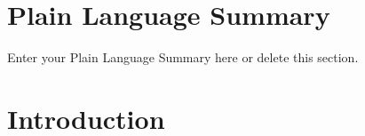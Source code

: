 \documentclass[draft]{agujournal2019}
\begin{document}
\section*{Plain Language Summary}
Enter your Plain Language Summary here or delete this section.



%
%

%


%
%
%
%

\section{Introduction}\label{SEC:intro}
\end{document}
